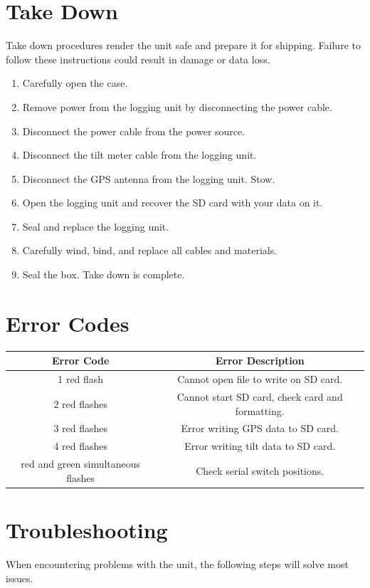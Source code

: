 \documentclass[11pt]{article} %
\begin{document}
\newpage
\section{Take Down}
Take down procedures render the unit safe and prepare it for shipping. Failure to follow these instructions could result in damage or data loss.

\begin{enumerate}
\item Carefully open the case.
\item Remove power from the logging unit by disconnecting the power cable.
\item Disconnect the power cable from the power source.
\item Disconnect the tilt meter cable from the logging unit.
\item Disconnect the GPS antenna from the logging unit. Stow.
\item Open the logging unit and recover the SD card with your data on it.
\item Seal and replace the logging unit.
\item Carefully wind, bind, and replace all cables and materials.
\item Seal the box. Take down is complete.
\end{enumerate}

\newpage
\section{Error Codes}

\begin{center}
    \begin{tabular}{ |c|c|}
    \hline
    Error Code & Error Description\\
    \hline
    1 red flash &  Cannot open file to write on SD card.\\
    \hline
    2 red flashes &  Cannot start SD card, check card and formatting.\\
    \hline
    3 red flashes &  Error writing GPS data to SD card.\\
    \hline
    4 red flashes &  Error writing tilt data to SD card.\\
    \hline
    red and green simultaneous flashes &  Check serial switch positions.\\
    \hline
    \end{tabular}
\end{center}

\section{Troubleshooting}
When encountering problems with the unit, the following steps will solve most issues.
\end{document}
